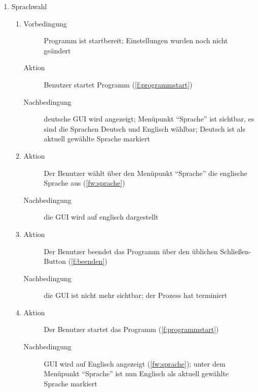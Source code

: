 \begin{enumerate} [label=\bfseries /TSW \arabic*0/, leftmargin=*]
	\item Sprachwahl \label{ts:sprachwahl}
	\begin{enumerate}[leftmargin=0pt]
		\item
		\begin{description}
			\item[Vorbedingung] Programm ist startbereit; Einstellungen wurden noch nicht geändert
			\item[Aktion] Benutzer startet Programm (\ref{f:programmstart})
			\item[Nachbedingung] deutsche \gls{GUI} wird angezeigt; Menüpunkt \enquote{Sprache} ist sichtbar, es sind die Sprachen Deutsch und Englisch wählbar; Deutsch ist als aktuell gewählte Sprache markiert
		\end{description}
		\item
		\begin{description}
			\item[Aktion] Der Benutzer wählt über den Menüpunkt \enquote{Sprache} die englische Sprache aus (\ref{fw:sprache})
			\item[Nachbedingung] die \gls{GUI} wird auf englisch dargestellt
		\end{description}
		\item
		\begin{description}
			\item[Aktion] Der Benutzer beendet das Programm über den üblichen Schließen-Button (\ref{f:beenden})
			\item[Nachbedingung] die \gls{GUI} ist nicht mehr sichtbar; der Prozess hat terminiert
		\end{description}
		\item
		\begin{description}
			\item[Aktion] Der Benutzer startet das Programm (\ref{f:programmstart})
			\item[Nachbedingung] \gls{GUI} wird auf Englisch angezeigt (\ref{fw:sprache}); unter dem Menüpunkt \enquote{Sprache} ist nun Englisch als aktuell gewählte Sprache markiert
		\end{description}
	\end{enumerate}


\end{enumerate}
